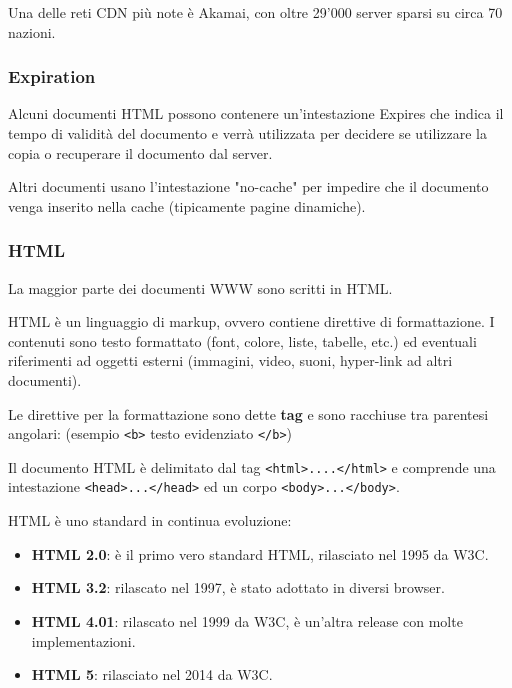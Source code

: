            Una delle reti CDN più note è Akamai, con oltre 29'000 server sparsi su circa 70 nazioni.

        \subsubsection{Expiration}
            Alcuni documenti HTML possono contenere un'intestazione Expires che indica il tempo di validità del documento e verrà utilizzata per decidere se utilizzare la copia o recuperare il documento dal server.

            

            Altri documenti usano l'intestazione "no-cache" per impedire che il documento venga inserito nella cache (tipicamente pagine dinamiche).

            

        \subsubsection{HTML}
            La maggior parte dei documenti WWW sono scritti in HTML.
        
            HTML è un linguaggio di markup, ovvero contiene direttive di formattazione. I contenuti sono testo formattato (font, colore, liste, tabelle, etc.) ed eventuali riferimenti ad oggetti esterni (immagini, video, suoni, hyper-link ad altri documenti).

            Le direttive per la formattazione sono dette \textbf{tag} e sono racchiuse tra parentesi angolari: (esempio \verb:<b>: testo evidenziato \verb:</b>:)

            Il documento HTML è delimitato dal tag \verb:<html>....</html>: e comprende una intestazione \verb:<head>...</head>: ed un corpo \verb:<body>...</body>:.

            HTML è uno standard in continua evoluzione:
            \begin{itemize}
                \item \textbf{HTML 2.0}: è il primo vero standard HTML, rilasciato nel 1995 da W3C.
                \item \textbf{HTML 3.2}: rilascato nel 1997, è stato adottato in diversi browser.
                \item \textbf{HTML 4.01}: rilascato nel 1999 da W3C, è un'altra release con molte implementazioni.
                \item \textbf{HTML 5}: rilasciato nel 2014 da W3C.
            \end{itemize}

